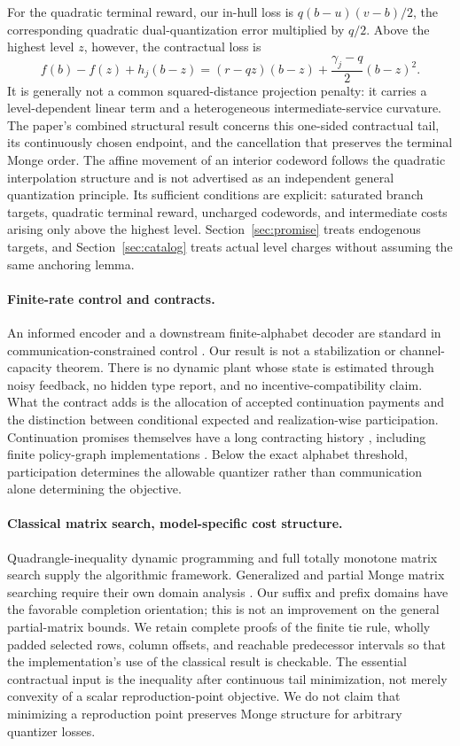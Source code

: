 For the quadratic terminal reward, our in-hull loss is $q(b-u)(v-b)/2$, the corresponding quadratic dual-quantization error multiplied by $q/2$. Above the highest level $z$, however, the contractual loss is
\[
 f(b)-f(z)+h_j(b-z)
 =(r-qz)(b-z)+\frac{\gamma_j-q}{2}(b-z)^2.
\]
It is generally not a common squared-distance projection penalty: it carries a level-dependent linear term and a heterogeneous intermediate-service curvature. The paper's combined structural result concerns this one-sided contractual tail, its continuously chosen endpoint, and the cancellation that preserves the terminal Monge order. The affine movement of an interior codeword follows the quadratic interpolation structure and is not advertised as an independent general quantization principle. Its sufficient conditions are explicit: saturated branch targets, quadratic terminal reward, uncharged codewords, and intermediate costs arising only above the highest level. Section~\ref{sec:promise} treats endogenous targets, and Section~\ref{sec:catalog} treats actual level charges without assuming the same anchoring lemma.

\paragraph{Finite-rate control and contracts.}
An informed encoder and a downstream finite-alphabet decoder are standard in communication-constrained control \citep{Fu2024}. Our result is not a stabilization or channel-capacity theorem. There is no dynamic plant whose state is estimated through noisy feedback, no hidden type report, and no incentive-compatibility claim. What the contract adds is the allocation of accepted continuation payments and the distinction between conditional expected and realization-wise participation. Continuation promises themselves have a long contracting history \citep{SpearSrivastava1987,ThomasWorrall1988}, including finite policy-graph implementations \citep{Zhang2012}. Below the exact alphabet threshold, participation determines the allowable quantizer rather than communication alone determining the objective.

\paragraph{Classical matrix search, model-specific cost structure.}
Quadrangle-inequality dynamic programming \citep{Yao1980} and full totally monotone matrix search \citep{AggarwalEtAl1987} supply the algorithmic framework. Generalized and partial Monge matrix searching require their own domain analysis \citep{KlaweKleitman1990,Chan2021,Kaplan2017}. Our suffix and prefix domains have the favorable completion orientation; this is not an improvement on the general partial-matrix bounds. We retain complete proofs of the finite tie rule, wholly padded selected rows, column offsets, and reachable predecessor intervals so that the implementation's use of the classical result is checkable. The essential contractual input is the inequality after continuous tail minimization, not merely convexity of a scalar reproduction-point objective. We do not claim that minimizing a reproduction point preserves Monge structure for arbitrary quantizer losses.

